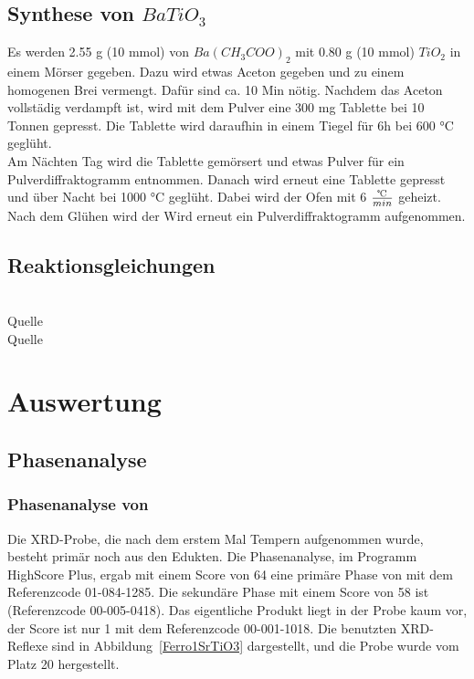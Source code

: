 \documentclass[12pt, a4paper]{article}
\begin{document}
\subsection{\texorpdfstring{Synthese von $BaTiO_3$}{Synthese von BaTiO3}}
{
Es werden 2.55 g (10 mmol) von $Ba(CH_3COO)_2$ mit 0.80 g (10 mmol) $TiO_2$ in einem Mörser gegeben.
Dazu wird etwas Aceton gegeben und 
zu einem homogenen Brei vermengt. Dafür sind ca. 10 Min nötig. Nachdem das Aceton vollstädig verdampft ist, wird mit dem Pulver eine 300 mg 
Tablette bei 10 Tonnen gepresst. Die Tablette wird daraufhin in einem Tiegel für 6h bei 600 °C geglüht.\\
Am Nächten Tag wird die Tablette gemörsert und etwas Pulver für ein Pulverdiffraktogramm entnommen. Danach wird erneut eine Tablette gepresst und über Nacht
bei 1000 °C geglüht. Dabei wird der Ofen mit 6 $\frac{\tccentigrade}{min}$ geheizt. Nach dem Glühen wird der Wird erneut ein Pulverdiffraktogramm aufgenommen.
}
\subsection{Reaktionsgleichungen }
\begin{center}
\\
 Quelle\cite{Reaktionsgleichungen}\\
 Quelle\cite{Reaktionsgleichungen}


\end{center}
\newpage
\section{Auswertung}
\subsection{Phasenanalyse}
\subsubsection{\texorpdfstring{Phasenanalyse von }{Phasenanalyse von SrTiO3}}
Die XRD-Probe, die nach dem erstem Mal Tempern aufgenommen wurde, besteht primär noch aus den Edukten. 
Die Phasenanalyse, im Programm HighScore Plus, ergab mit einem Score von 64 eine primäre Phase von  mit dem Referenzcode 01-084-1285.
Die sekundäre Phase mit einem Score von 58 ist  (Referenzcode 00-005-0418). Das eigentliche Produkt  liegt in der Probe
kaum vor, der Score ist nur 1 mit dem Referenzcode 00-001-1018. Die benutzten XRD-Reflexe sind in \mbox{Abbildung \ref{Ferro1SrTiO3}} dargestellt, und die Probe wurde vom Platz 20 hergestellt.
\end{document}
